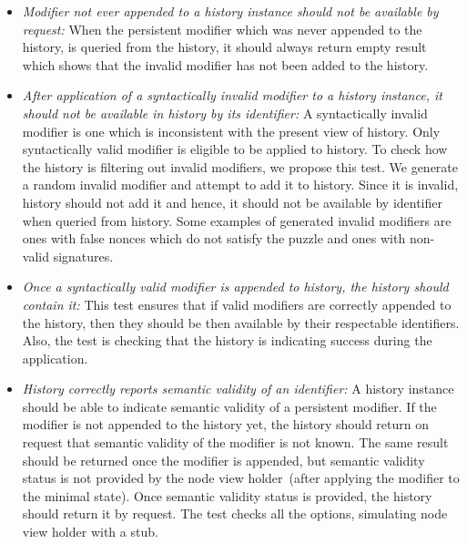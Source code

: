 \begin{enumerate}[\IEEEsetlabelwidth{Z}]
\begin{itemize}[]
\item \textit{Modifier not ever appended to a history instance should not be available by request:} When the persistent modifier which was never appended to the history, is queried from the history, it should always return empty result which shows that the invalid modifier has not been added to the history.\\

\item \textit{After application of a syntactically invalid modifier to a history instance, it should not be available in history by its identifier:} A syntactically invalid modifier is one which is inconsistent with the present view of history. Only syntactically valid modifier is eligible to be applied to history. To check how the history is filtering out invalid modifiers, we propose this test. We generate a random invalid modifier and attempt to add it to history. Since it is invalid, history should not add it and hence, it should not be available by identifier when queried from history. Some examples of generated invalid modifiers are ones with false nonces which do not satisfy the puzzle and ones with non-valid signatures.\\

\item \textit{Once a syntactically valid modifier is appended to history, the history should contain it:} This test ensures that if valid modifiers are correctly appended to the history, then they should be then available by their respectable identifiers. Also, the test is checking that the history is indicating success during the application.\\

\item \textit{History correctly reports semantic validity of an identifier:} A history instance should be able to indicate semantic validity of a persistent modifier. If the modifier is not appended to the history yet, the history should return on request that semantic validity of the modifier is not known. The same result should be returned once the modifier is appended, but semantic validity status is not provided by the node view holder~(after applying the modifier to the minimal state). Once semantic validity status is provided, the history should return it by request. The test checks all the options, simulating node view holder with a stub.\\   

\end{itemize}


\end{enumerate}
